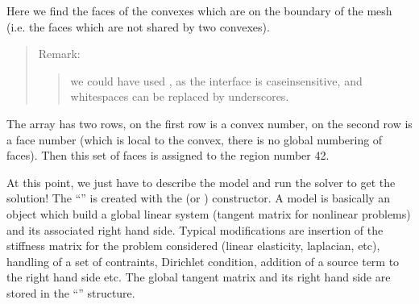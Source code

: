 \documentclass[a4paper,11pt,english]{sphinxmanual}
\begin{document}
\begin{sphinxVerbatim}[commandchars=\\\{\}]
\PYG{p}{[}\PYG{p}{]}
\end{sphinxVerbatim}

\sphinxAtStartPar
Here we find the faces of the convexes which are on the boundary of the mesh (i.e.
the faces which are not shared by two convexes).
\begin{quote}

\sphinxAtStartPar
Remark:
\begin{quote}

\sphinxAtStartPar
we could have used , as the interface is
case\sphinxhyphen{}insensitive, and whitespaces can be replaced by underscores.
\end{quote}
\end{quote}

\sphinxAtStartPar
The array  has two rows, on the first row is a convex number, on the
second row is a face number (which is local to the convex, there is no global
numbering of faces). Then this set of faces is assigned to the region number 42.

\sphinxAtStartPar
At this point, we just have to describe the model and run the solver to get the
solution! The “” is created with the  (or )
constructor. A model is basically an object which build a global linear system
(tangent matrix for non\sphinxhyphen{}linear problems) and its associated right hand side.
Typical modifications are insertion of the stiffness matrix for the problem
considered (linear elasticity, laplacian, etc), handling of a set of contraints,
Dirichlet condition, addition of a source term to the right hand side etc. The
global tangent matrix and its right hand side are stored in the “”
structure.
\end{document}
